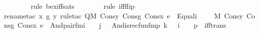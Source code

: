 \begin{isabellebody}
\ \ \ \ \ \ \isamarkupfalse%
\ {\isacharparenleft}{\kern0pt}rule\ bex{\isacharunderscore}{\kern0pt}iff{\isacharunderscore}{\kern0pt}sats{\isacharparenright}{\kern0pt}\isanewline
\ \ \ \ \ \ \ \isamarkupfalse%
{\isacharparenleft}{\kern0pt}rule\ iff{\isacharunderscore}{\kern0pt}flip{\isacharparenright}{\kern0pt}\isanewline
\ \ \ \ \ \ \ \isamarkupfalse%
{\isacharparenleft}{\kern0pt}rename{\isacharunderscore}{\kern0pt}tac\ x{\isacharprime}{\kern0pt}\ g\ y{\isacharcomma}{\kern0pt}\ rule{\isacharunderscore}{\kern0pt}tac\ Q{\isacharequal}{\kern0pt}{\isachardoublequoteopen}{\isacharparenleft}{\kern0pt}M{\isacharcomma}{\kern0pt}\ Cons{\isacharparenleft}{\kern0pt}y{\isacharcomma}{\kern0pt}\ Cons{\isacharparenleft}{\kern0pt}g{\isacharcomma}{\kern0pt}\ Cons{\isacharparenleft}{\kern0pt}x{\isacharprime}{\kern0pt}{\isacharcomma}{\kern0pt}\ e{\isacharparenright}{\kern0pt}{\isacharparenright}{\kern0pt}{\isacharparenright}{\kern0pt}\ {\isasymTurnstile}\ Equal{\isacharparenleft}{\kern0pt}i\ {\isacharhash}{\kern0pt}{\isacharplus}{\kern0pt}\ {}{\isacharcomma}{\kern0pt}\ {}{\isacharparenright}{\kern0pt}{\isacharparenright}{\kern0pt}\ {\isasymand}\ {\isacharparenleft}{\kern0pt}M{\isacharcomma}{\kern0pt}\ Cons{\isacharparenleft}{\kern0pt}y{\isacharcomma}{\kern0pt}\ Cons{\isacharparenleft}{\kern0pt}g{\isacharcomma}{\kern0pt}\ Cons{\isacharparenleft}{\kern0pt}x{\isacharprime}{\kern0pt}{\isacharcomma}{\kern0pt}\ e{\isacharparenright}{\kern0pt}{\isacharparenright}{\kern0pt}{\isacharparenright}{\kern0pt}\ {\isasymTurnstile}\ And{\isacharparenleft}{\kern0pt}pair{\isacharunderscore}{\kern0pt}fm{\isacharparenleft}{\kern0pt}i\ {\isacharhash}{\kern0pt}{\isacharplus}{\kern0pt}\ {}{\isacharcomma}{\kern0pt}\ {}{\isacharcomma}{\kern0pt}\ j\ {\isacharhash}{\kern0pt}{\isacharplus}{\kern0pt}\ {}{\isacharparenright}{\kern0pt}{\isacharcomma}{\kern0pt}\ And{\isacharparenleft}{\kern0pt}is{\isacharunderscore}{\kern0pt}recfun{\isacharunderscore}{\kern0pt}fm{\isacharparenleft}{\kern0pt}p{\isacharcomma}{\kern0pt}\ k\ {\isacharhash}{\kern0pt}{\isacharplus}{\kern0pt}\ {}{\isacharcomma}{\kern0pt}\ i\ {\isacharhash}{\kern0pt}{\isacharplus}{\kern0pt}\ {}{\isacharcomma}{\kern0pt}\ {}{\isacharparenright}{\kern0pt}{\isacharcomma}{\kern0pt}\ p{\isacharparenright}{\kern0pt}{\isacharparenright}{\kern0pt}{\isacharparenright}{\kern0pt}{\isachardoublequoteclose}\ \ iff{\isacharunderscore}{\kern0pt}trans{\isacharparenright}{\kern0pt}\isanewline
\ \ \ \ \isamarkupfalse%

\end{isabellebody}
